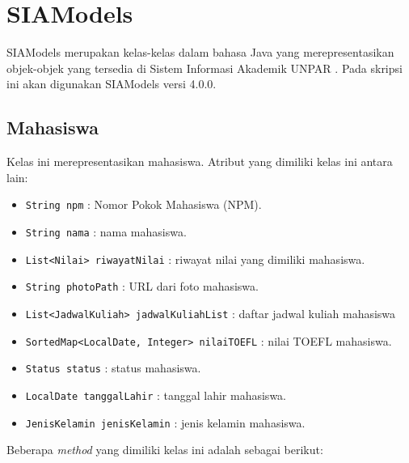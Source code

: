 \section{SIAModels}
\label{sec:siamodels}

SIAModels merupakan kelas-kelas dalam bahasa Java yang merepresentasikan objek-objek yang tersedia di Sistem Informasi Akademik UNPAR \cite{siamodels}. Pada skripsi ini akan digunakan SIAModels versi 4.0.0.

\subsection{Mahasiswa}
Kelas ini merepresentasikan mahasiswa. Atribut yang dimiliki kelas ini antara lain:
\begin{itemize}
	\item \texttt{String npm} : Nomor Pokok Mahasiswa (NPM).
	\item \texttt{String nama} : nama mahasiswa.
	\item \texttt{List<Nilai> riwayatNilai} : riwayat nilai yang dimiliki mahasiswa.
	\item \texttt{String photoPath} : URL dari foto mahasiswa.
	\item \texttt{List<JadwalKuliah> jadwalKuliahList} : daftar jadwal kuliah mahasiswa
	\item \texttt{SortedMap<LocalDate, Integer> nilaiTOEFL} : nilai TOEFL mahasiswa.
	\item \texttt{Status status} : status mahasiswa.
	\item \texttt{LocalDate tanggalLahir} : tanggal lahir mahasiswa.
	\item \texttt{JenisKelamin jenisKelamin} : jenis kelamin mahasiswa.

\end{itemize}
Beberapa \textit{method} yang dimiliki kelas ini adalah sebagai berikut:

